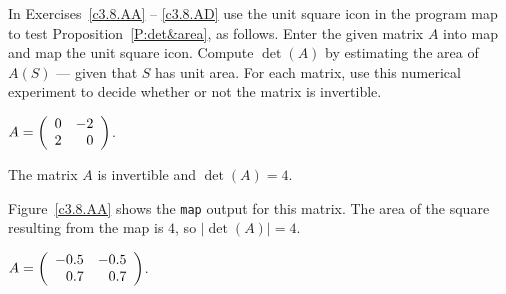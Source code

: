 \documentclass{ximera}
\begin{document}
\noindent  In Exercises~\ref{c3.8.AA} -- \ref{c3.8.AD} use the {\sf unit 
square} icon in the program {\sf map} to test Proposition~\ref{P:det&area}, as 
follows. Enter the given matrix $A$ into {\sf map} and map the {\sf unit 
square} icon.  Compute $\det(A)$ by estimating the area of $A(S)$ --- given 
that $S$ has unit area.  For each matrix, use this numerical experiment to 
decide whether or not the matrix is invertible.
\begin{exercise}  \label{c3.8.AA}
$A=\left(\begin{array}{rr} 0 & -2\\ 2 &0\end{array}\right)$.

\begin{solution}
\ans The matrix $A$ is invertible and $\det(A) = 4$.

\soln Figure~\ref{c3.8.AA} shows the {\tt map} output for this matrix.
The area of the square resulting from the map is $4$, so $|\det(A)| = 4$.

\end{solution}
\end{exercise}
\begin{exercise}  \label{c3.8.AB}
$A=\left(\begin{array}{rr} -0.5 & -0.5\\ 0.7 &0.7\end{array}\right)$.

\end{exercise}
\end{document}
